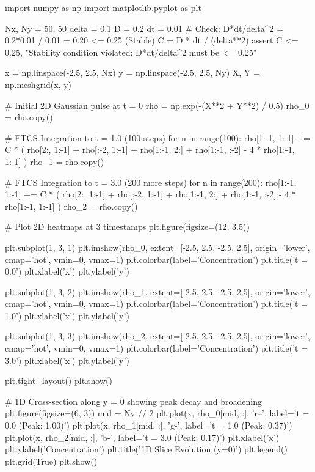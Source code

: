 \documentclass{article}
\begin{document}
\begin{jupytercode}
import numpy as np
import matplotlib.pyplot as plt

Nx, Ny = 50, 50
delta = 0.1
D = 0.2
dt = 0.01             # Check: D*dt/delta^2 = 0.2*0.01 / 0.01 = 0.20 <= 0.25 (Stable)
C = D * dt / (delta**2)
assert C <= 0.25, "Stability condition violated: D*dt/delta^2 must be <= 0.25"

x = np.linspace(-2.5, 2.5, Nx)
y = np.linspace(-2.5, 2.5, Ny)
X, Y = np.meshgrid(x, y)

# Initial 2D Gaussian pulse at t = 0
rho = np.exp(-(X**2 + Y**2) / 0.5)
rho_0 = rho.copy()

# FTCS Integration to t = 1.0 (100 steps)
for n in range(100):
    rho[1:-1, 1:-1] += C * (
        rho[2:, 1:-1] + rho[:-2, 1:-1] + 
        rho[1:-1, 2:] + rho[1:-1, :-2] - 4 * rho[1:-1, 1:-1]
    )
rho_1 = rho.copy()

# FTCS Integration to t = 3.0 (200 more steps)
for n in range(200):
    rho[1:-1, 1:-1] += C * (
        rho[2:, 1:-1] + rho[:-2, 1:-1] + 
        rho[1:-1, 2:] + rho[1:-1, :-2] - 4 * rho[1:-1, 1:-1]
    )
rho_2 = rho.copy()

# Plot 2D heatmaps at 3 timestamps
plt.figure(figsize=(12, 3.5))

plt.subplot(1, 3, 1)
plt.imshow(rho_0, extent=[-2.5, 2.5, -2.5, 2.5], origin='lower', cmap='hot', vmin=0, vmax=1)
plt.colorbar(label='Concentration')
plt.title('t = 0.0')
plt.xlabel('x')
plt.ylabel('y')

plt.subplot(1, 3, 2)
plt.imshow(rho_1, extent=[-2.5, 2.5, -2.5, 2.5], origin='lower', cmap='hot', vmin=0, vmax=1)
plt.colorbar(label='Concentration')
plt.title('t = 1.0')
plt.xlabel('x')
plt.ylabel('y')

plt.subplot(1, 3, 3)
plt.imshow(rho_2, extent=[-2.5, 2.5, -2.5, 2.5], origin='lower', cmap='hot', vmin=0, vmax=1)
plt.colorbar(label='Concentration')
plt.title('t = 3.0')
plt.xlabel('x')
plt.ylabel('y')

plt.tight_layout()
plt.show()

# 1D Cross-section along y = 0 showing peak decay and broadening
plt.figure(figsize=(6, 3))
mid = Ny // 2
plt.plot(x, rho_0[mid, :], 'r--', label='t = 0.0 (Peak: 1.00)')
plt.plot(x, rho_1[mid, :], 'g-', label='t = 1.0 (Peak: 0.37)')
plt.plot(x, rho_2[mid, :], 'b-', label='t = 3.0 (Peak: 0.17)')
plt.xlabel('x')
plt.ylabel('Concentration')
plt.title('1D Slice Evolution (y=0)')
plt.legend()
plt.grid(True)
plt.show()
\end{jupytercode}
\newpage
\end{document}
